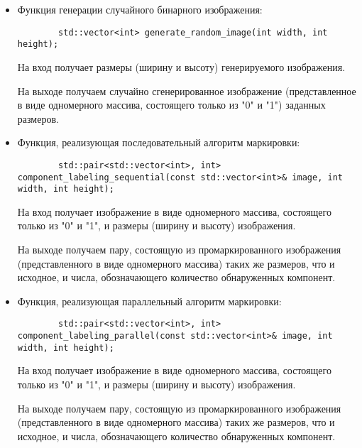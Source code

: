 \documentclass{report}
\begin{document}
		\begin{itemize}
			\item Функция генерации случайного бинарного изображения:
			\begin{lstlisting}
		std::vector<int> generate_random_image(int width, int height);
			\end{lstlisting}
			\par На вход получает размеры (ширину и высоту) генерируемого изображения. 
			\par На выходе получаем случайно сгенерированное изображение (представленное в виде одномерного массива, состоящего только из "0"{} и "1"{}) заданных размеров.

			\item Функция, реализующая последовательный алгоритм маркировки:
			\begin{lstlisting}
		std::pair<std::vector<int>, int> component_labeling_sequential(const std::vector<int>& image, int width, int height);
			\end{lstlisting}
			\par На вход получает изображение в виде одномерного массива, состоящего только из "0"{} и "1"{}, и размеры (ширину и высоту) изображения. 
			\par На выходе получаем пару, состоящую из промаркированного изображения (представленного в виде одномерного массива) таких же размеров, что и исходное, и числа, обозначающего количество обнаруженных компонент.

			\item Функция, реализующая параллельный алгоритм маркировки:
			\begin{lstlisting}
		std::pair<std::vector<int>, int> component_labeling_parallel(const std::vector<int>& image, int width, int height);
			\end{lstlisting}
			\par На вход получает изображение в виде одномерного массива, состоящего только из "0"{} и "1"{}, и размеры (ширину и высоту) изображения. 
			\par На выходе получаем пару, состоящую из промаркированного изображения (представленного в виде одномерного массива) таких же размеров, что и исходное, и числа, обозначающего количество обнаруженных компонент.


\end{itemize}
\end{document}
